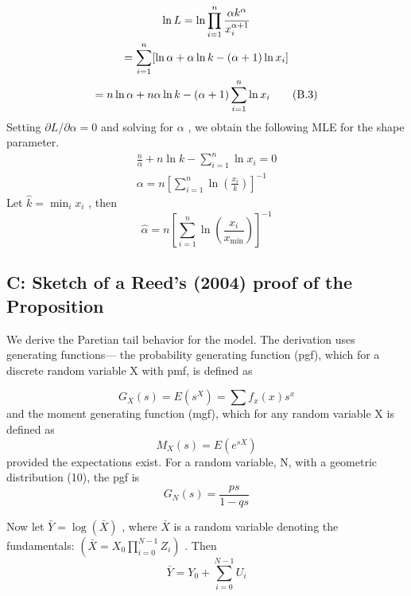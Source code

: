\documentclass[10pt,a4paper]{article}
\begin{document}
\begin{gather}
\ln L =\ln \prod^{n}_{i=1}\frac{\alpha k^{\alpha}}{x^{\alpha+1}_{i}}   \notag \\
       =\sum^{n}_{i=1}[\ln \alpha+\alpha \ln k-(\alpha+1)\ln x_{i}]  \notag \\
      =n\ln \alpha+n\alpha \ln k-(\alpha+1)\sum^{n}_{i=1}\ln x_{i}  \tag{B.3}
\end{gather}
Setting $\partial L/\partial \alpha=0$  and solving for $\alpha$  , we obtain the following MLE for the shape  parameter. 
\begin{gather}
\frac{n}{\alpha}+n\ln k-\sum^{n}_{i=1}\ln x_{i}=0     \tag{B.4}  \\
\alpha=n[\sum^{n}_{i=1}\ln (\frac{x_{i}}{k})]^{-1}      \tag{B.5}  
\end{gather}
Let $\hat{k}=\min_{i} x_{i} $ ,  then 
\begin{equation}
\hat{\alpha}=n[\sum^{n}_{i=1}\ln (\frac{x_{i}}{x_{\min }})]^{-1}  \tag{B.6}
\end{equation}

\subsection*{C: Sketch of a Reed's (2004) proof of the Proposition}

We derive the Paretian tail behavior for the model. The derivation uses generating functions— the probability generating function (pgf), which for a discrete random variable X with pmf, is defined as 

\begin{equation}
G_{X}(s)=E(s^{X})=\sum f_{x}(x)s^{x}  \tag{C.1}
\end{equation}
and the moment generating function (mgf), which for any random variable X is defined as 
\begin{equation}
M_{X}(s)=E(e^{sX})  \tag{C.2}
\end{equation}
provided the expectations exist. For a random variable, N, with a geometric distribution (10), the pgf is 
\begin{equation}
G_{N}(s)=\frac{ps}{1-qs}  \tag{C.3}
\end{equation}

Now let $\bar{Y}=\log (\bar{X})$  , where $\bar{X}$   is a random variable denoting the fundamentals: 
$(\bar{X}=X_{0}\prod^{N-1}_{i=0}Z_{i})$
 . 
Then 
\begin{equation}
 \bar{Y}=Y_{0}+\sum^{N-1}_{i=0}U_{i}   \tag{C.4}
\end{equation}
\end{document}
